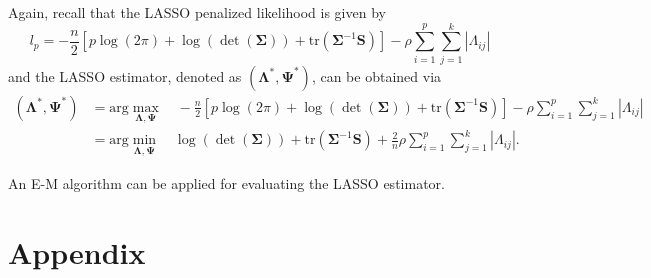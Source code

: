 \documentclass[
  a4paper,
  oneside,
  openany,
  12pt,
  onecolumn]{book}
\theoremstyle{plain}
\theoremstyle{remark}
\begin{document}
Again, recall that the LASSO penalized likelihood is given by
\[l_p=-\frac{n}{2}[p\log(2\pi)+\log(\det(\boldsymbol{\Sigma}))+\text{tr}(\boldsymbol{\Sigma}^{-1}\boldsymbol{S})]-\rho\sum^p_{i=1}\sum^k_{j=1}|\Lambda_{ij}|\]
and the LASSO estimator, denoted as
\((\boldsymbol{\Lambda}^*,\boldsymbol{\Psi}^*)\), can be obtained via
\begin{align*}
(\boldsymbol{\Lambda}^*,\boldsymbol{\Psi}^*) &= \text{arg}\max_{\boldsymbol{\Lambda},\boldsymbol{\Psi}} \quad -\frac{n}{2}[p\log(2\pi)+\log(\det(\boldsymbol{\Sigma}))+\text{tr}(\boldsymbol{\Sigma}^{-1}\boldsymbol{S})]-\rho\sum^p_{i=1}\sum^k_{j=1}|\Lambda_{ij}|\\
&=\text{arg}\min_{\boldsymbol{\Lambda},\boldsymbol{\Psi}} \quad \log(\det(\boldsymbol{\Sigma}))+\text{tr}(\boldsymbol{\Sigma}^{-1}\boldsymbol{S})+\frac{2}{n}\rho\sum^p_{i=1}\sum^k_{j=1}|\Lambda_{ij}|.
\end{align*}

An E-M algorithm can be applied for evaluating the LASSO estimator.

\section{Appendix}\label{appendix}
\end{document}
